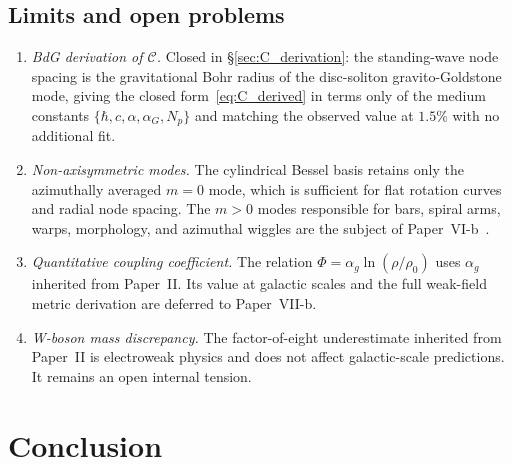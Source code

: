 \documentclass[11pt,a4paper]{article}
\begin{document}
\subsection{Limits and open problems}

\begin{enumerate}
  \item \emph{BdG derivation of $\mathcal{C}$.}  Closed in
    \S\ref{sec:C_derivation}: the standing-wave node spacing is the gravitational
    Bohr radius of the disc-soliton gravito-Goldstone mode, giving the closed
    form~\eqref{eq:C_derived} in terms only of the medium constants
    $\{\hbar,c,\alpha,\alpha_G,N_p\}$ and matching the observed value at $1.5\%$
    with no additional fit.

  \item \emph{Non-axisymmetric modes.}  The cylindrical Bessel basis retains only the
    azimuthally averaged $m=0$ mode, which is sufficient for flat rotation curves and
    radial node spacing.  The $m>0$ modes responsible for bars, spiral arms, warps,
    morphology, and azimuthal wiggles are the subject of Paper~VI-b~\cite{SSV-VIb}.

  \item \emph{Quantitative coupling coefficient.}  The relation $\Phi = \alpha_g
    \ln(\rho/\rho_0)$ uses $\alpha_g$ inherited from Paper~II.  Its value at galactic
    scales and the full weak-field metric derivation are deferred to Paper~VII-b.

  \item \emph{W-boson mass discrepancy.}  The factor-of-eight underestimate inherited from
    Paper~II is electroweak physics and does not affect galactic-scale predictions.  It
    remains an open internal tension.
\end{enumerate}

\section{Conclusion}
\label{sec:conclusion}
\end{document}
